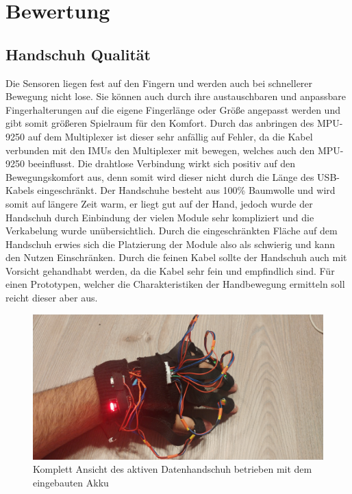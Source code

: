 \chapter{Bewertung}

\section{Handschuh Qualität}

Die Sensoren liegen fest auf den Fingern und werden auch bei schnellerer Bewegung nicht lose. Sie können auch durch ihre austauschbaren und anpassbare Fingerhalterungen auf die eigene Fingerlänge oder Größe angepasst werden und gibt somit größeren Spielraum für den Komfort. Durch das anbringen des MPU-9250 auf dem Multiplexer ist dieser sehr anfällig auf Fehler, da die Kabel verbunden mit den IMUs den Multiplexer mit bewegen, welches auch den MPU-9250 beeinflusst. 
Die drahtlose Verbindung wirkt sich positiv auf den Bewegungskomfort aus, denn somit wird dieser nicht durch die Länge des USB-Kabels eingeschränkt. 
Der Handschuhe besteht aus 100\% Baumwolle und wird somit auf längere Zeit warm, er liegt gut auf der Hand, jedoch wurde der Handschuh durch Einbindung der vielen Module sehr kompliziert und die Verkabelung wurde unübersichtlich. Durch die eingeschränkten Fläche auf dem Handschuh erwies sich die Platzierung der Module also als schwierig und kann den Nutzen Einschränken. 
Durch die feinen Kabel sollte der Handschuh auch mit Vorsicht gehandhabt werden, da die Kabel sehr fein und empfindlich sind. Für einen Prototypen, welcher die Charakteristiken der Handbewegung ermitteln soll reicht dieser aber aus.
\begin{figure}[h]
	\centering
    \includegraphics[width=1\columnwidth]{Bachelorarbeit/images/FullView.jpg}
    \caption{Komplett Ansicht des aktiven Datenhandschuh betrieben mit dem eingebauten Akku}
    \label{fig:FullView}
\end{figure}



